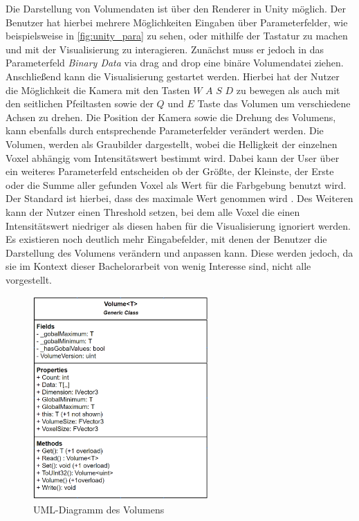 Die Darstellung von Volumendaten ist über den Renderer in Unity möglich. Der Benutzer hat hierbei mehrere Möglichkeiten Eingaben über Parameterfelder, wie beispielsweise in \autoref{fig:unity_para} zu sehen, oder mithilfe der Tastatur zu machen und mit der Visualisierung zu interagieren. Zunächst muss er jedoch in das Parameterfeld \textit{Binary Data} via drag and drop eine binäre Volumendatei ziehen.
Anschließend kann die Visualisierung gestartet werden. Hierbei hat der Nutzer die Möglichkeit die Kamera mit den Tasten $W$ $A$ $S$ $D$ zu bewegen als auch mit den seitlichen Pfeiltasten sowie der $Q$ und $E$ Taste das Volumen um verschiedene Achsen zu drehen. Die Position der Kamera sowie die Drehung des Volumens, kann ebenfalls durch entsprechende Parameterfelder verändert werden.
Die Volumen, werden als Graubilder dargestellt, wobei die Helligkeit der einzelnen Voxel abhängig vom Intensitätswert bestimmt wird. Dabei kann der User über ein weiteres Parameterfeld entscheiden ob der Größte, der Kleinste, der Erste oder die Summe aller gefunden Voxel als Wert für die Farbgebung benutzt wird. Der Standard ist hierbei, dass des maximale Wert genommen wird .
\newline
Des Weiteren kann der Nutzer einen Threshold setzen, bei dem alle Voxel die einen Intensitätswert niedriger als diesen haben für die Visualisierung ignoriert werden.
Es existieren noch deutlich mehr Eingabefelder, mit denen der Benutzer die Darstellung des Volumens verändern und anpassen kann. Diese werden jedoch, da sie im Kontext dieser Bachelorarbeit von wenig Interesse sind, nicht alle vorgestellt.


\begin{figure}
\centering
\includegraphics[width=0.6\textwidth]{Logos/Volume_UML.PNG}
\caption{UML-Diagramm des Volumens} 
\label{fig:volume_uml} 
\end{figure}


